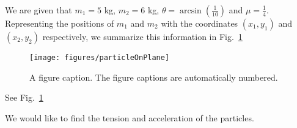 %
%
%

\begin{subquestions}

\subquestion 

We are given that $m_1 = 5$ kg, $m_2 = 6$ kg, $\theta = \arcsin\left(\frac{1}{10}\right)$ and $\mu = \frac{1}{4}$. Representing the positions of $m_1$ and $m_2$ with the coordinates $(x_1,y_1)$ and $(x_2,y_2)$ respectively, we summarize this information in Fig.~\ref{2015:q5:fig:force1}

\begin{figure}
\begin{center}
\texttt{[image: figures/particleOnPlane]}
\caption{\label{2015:q5:fig:force1} A figure caption. The figure captions are
automatically numbered.}
\end{center}
\end{figure}


\item See Fig.~\ref{2015:q5:fig:force1}

\item We would like to find the tension and acceleration of the particles.



\end{subquestions}
